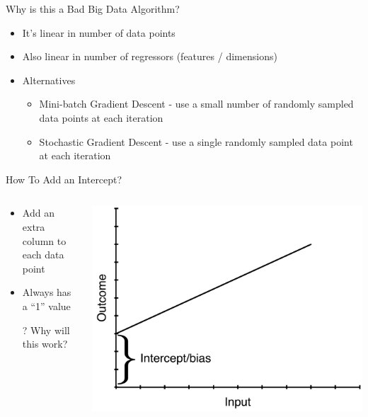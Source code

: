 \documentclass[aspectratio=169]{beamer}
\begin{document}
\begin{frame}{Why is this a Bad Big Data Algorithm?}

\begin{itemize}
\item It's linear in number of data points
\item Also linear in number of regressors (features / dimensions)
\item Alternatives
\begin{itemize}
\item Mini-batch Gradient Descent - use a small number of randomly sampled data points at each iteration
\item Stochastic Gradient Descent - use a single randomly sampled data point at each iteration
\end{itemize}
\end{itemize}
\end{frame}
\begin{frame}{How To Add an Intercept?}

\begin{columns}
\begin{column}{0.5\textwidth}
\begin{itemize}
\item Add an extra column to each data point
\item Always has a ``1'' value
\item[?] Why will this work?
\end{itemize}
\end{column}
\begin{column}{0.5\textwidth}
     \includegraphics[width=1\textwidth]{lectLR/intercept.pdf} 
\end{column}
\end{columns}
\end{frame}
\end{document}
